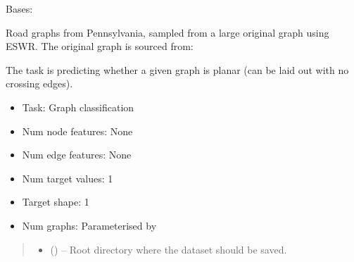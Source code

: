 \documentclass[letterpaper,10pt,english]{sphinxhowto}
\begin{document}
\begin{fulllineitems}
\label{\detokenize{datasets:datasets.RoadDataset}}
\pysigstartsignatures
{}
\pysigstopsignatures
\sphinxAtStartPar
Bases: 

\sphinxAtStartPar
Road graphs from Pennsylvania, sampled from a large original graph using ESWR.
The original graph is sourced from:
\begin{quote}

\sphinxAtStartPar
{}
\end{quote}

\sphinxAtStartPar
The task is predicting whether a given graph is planar (can be laid out with no crossing edges).
\begin{itemize}
\item {} 
\sphinxAtStartPar
Task: Graph classification

\item {} 
\sphinxAtStartPar
Num node features: None

\item {} 
\sphinxAtStartPar
Num edge features: None

\item {} 
\sphinxAtStartPar
Num target values: 1

\item {} 
\sphinxAtStartPar
Target shape: 1

\item {} 
\sphinxAtStartPar
Num graphs: Parameterised by 

\end{itemize}
\begin{quote}\begin{description}
\begin{itemize}
\item {} 
\sphinxAtStartPar
{} () – Root directory where the dataset should be saved.


\end{itemize}
\end{description}
\end{quote}
\end{fulllineitems}
\end{document}
